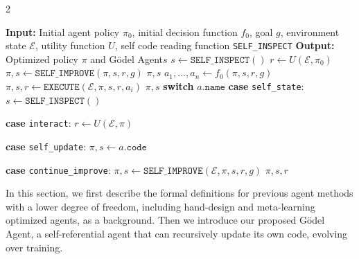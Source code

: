 \documentclass[11pt]{article}
\newcommand{\framework}{Gödel Agent\xspace}
\begin{document}
\begin{algorithm*}[t!]
\small
\caption{Recursive Self-Improvement of \framework}
\vspace{-12pt}
\label{alg:1}
\begin{multicols}{2}
\begin{algorithmic}[1]
\State \textbf{Input:} Initial agent policy $\pi_0$, initial decision function $f_0$, goal $g$, environment state $\mathcal{E}$, utility function $U$, self code reading function \texttt{SELF\_INSPECT}
\State \textbf{Output:} Optimized policy $\pi$ and \framework $s$
\State {}
\State $s \gets \texttt{SELF\_INSPECT}()$
\State {}
\State $r \gets U(\mathcal{E}, \pi_0)$
\State {}
\State $\pi, s \gets \texttt{SELF\_IMPROVE}(\pi, s, r, g)$
\State \Return $\pi, s$
\State {}
    \State {}
    \State $a_1, \ldots, a_n \gets f_0(\pi, s, r, g)$
        \State $\pi, s, r \gets \texttt{EXECUTE}(\mathcal{E}, \pi, s, r, a_i)$
    \EndFor
    \State \Return $\pi, s$
\EndFunction
\State {}
    \State \textbf{switch} $a.\texttt{name}$
    \State \quad \textbf{case} \texttt{self\_state}:
    \State \quad\quad $s \gets \texttt{SELF\_INSPECT}()$
    
    \State \quad \textbf{case} \texttt{interact}:
    \State \quad\quad $r \gets U(\mathcal{E}, \pi)$ 
    
    \State \quad \textbf{case} \texttt{self\_update}:
    \State \quad\quad $\pi, s \gets a.\texttt{code}$ 
    
    \State \quad \textbf{case} \texttt{continue\_improve}:
    \State \quad\quad {}
    \State \quad\quad $\pi, s \gets \texttt{SELF\_IMPROVE}(\mathcal{E}, \pi, s, r, g)$ 
    \State \Return $\pi, s, r$
\EndFunction
\vspace{-10pt}
\end{algorithmic}
\end{multicols}
\end{algorithm*}





In this section, we first describe the formal definitions for previous agent methods with a lower degree of freedom, including hand-design and meta-learning optimized agents, as a background. Then we introduce our proposed \framework, a self-referential agent that can recursively update its own code, evolving over training.
\end{document}
